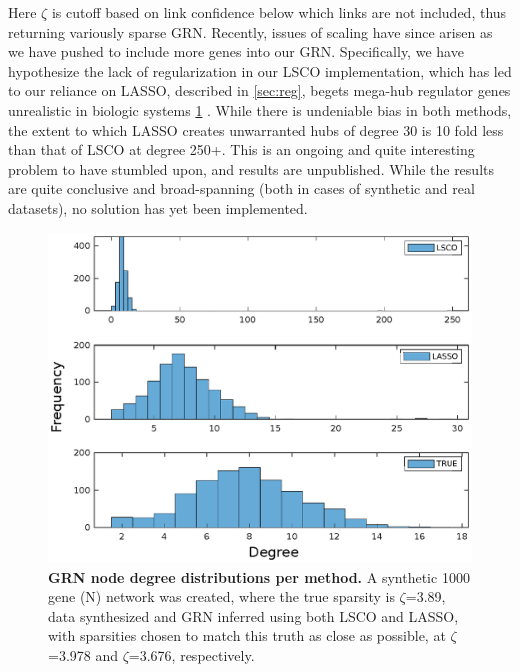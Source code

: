 Here $\zeta$ is cutoff based on link confidence below which links are not included, thus returning variously sparse GRN. Recently, issues of scaling have since arisen as we have pushed to include more genes into our GRN. Specifically, we have hypothesize the lack of regularization in our LSCO implementation, which has led to our reliance on LASSO, described in \cref{sec:reg}, begets mega-hub regulator genes unrealistic in biologic systems \cref{fig:hubiness} \citep{bock2012hub}. While there is undeniable bias in both methods, the extent to which LASSO creates unwarranted hubs of degree 30 is 10 fold less than that of LSCO at degree 250+. This is an ongoing and quite interesting problem to have stumbled upon, and results are unpublished. While the results are quite conclusive and broad-spanning (both in cases of synthetic and real datasets), no solution has yet been implemented.

\begin{figure}[H]
\centering
\includegraphics[width=1\linewidth]{3/hubs.eps}
\caption{\textbf{GRN node degree distributions per method.} A synthetic 1000 gene (N) network was created, where the true sparsity is $\zeta$=3.89, data synthesized and GRN inferred using both LSCO and LASSO, with sparsities chosen to match this truth as close as possible, at $\zeta$=3.978 and $\zeta$=3.676, respectively.}
\label{fig:hubiness}
\end{figure}





